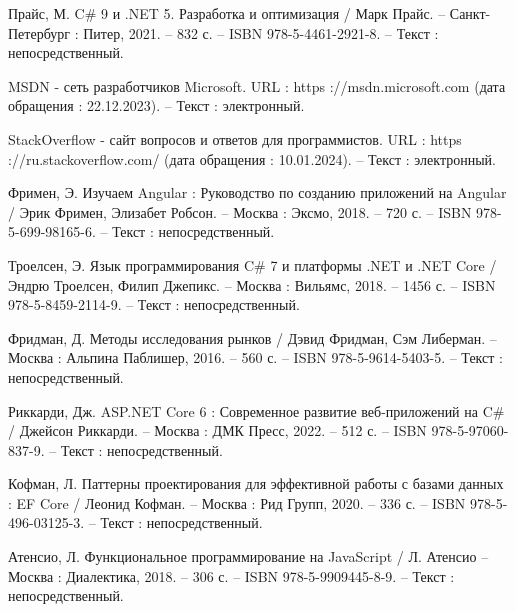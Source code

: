 \begin{thebibliography}{20}
     Прайс, М. C\# 9 и .NET 5. Разработка и оптимизация / Марк Прайс. – Санкт-Петербург : Питер, 2021. – 832 с. – ISBN 978-5-4461-2921-8. – Текст : непосредственный.

     MSDN -\- сеть разработчиков Microsoft. URL : https ://msdn.microsoft.com (дата обращения : 22.12.2023). – Текст : электронный.

     StackOverflow -\- сайт вопросов и ответов для программистов. URL : https ://ru.stackoverflow.com/ (дата обращения : 10.01.2024). – Текст : электронный.

     Фримен, Э. Изучаем Angular : Руководство по созданию приложений на Angular / Эрик Фримен, Элизабет Робсон. – Москва : Эксмо, 2018. – 720 с. – ISBN 978-5-699-98165-6. – Текст : непосредственный.

     Троелсен, Э. Язык программирования C\# 7 и платформы .NET и .NET Core / Эндрю Троелсен, Филип Джепикс. – Москва : Вильямс, 2018. – 1456 с. – ISBN 978-5-8459-2114-9. – Текст : непосредственный.

     Фридман, Д. Методы исследования рынков / Дэвид Фридман, Сэм Либерман. – Москва : Альпина Паблишер, 2016. – 560 с. – ISBN 978-5-9614-5403-5. – Текст : непосредственный.

     Риккарди, Дж. ASP.NET Core 6 : Современное развитие веб-приложений на C\# / Джейсон Риккарди. – Москва : ДМК Пресс, 2022. – 512 с. – ISBN 978-5-97060-837-9. – Текст : непосредственный.

     Кофман, Л. Паттерны проектирования для эффективной работы с базами данных : EF Core / Леонид Кофман. – Москва : Рид Групп, 2020. – 336 с. – ISBN 978-5-496-03125-3. – Текст : непосредственный.

     Атенсио, Л. Функциональное программирование на JavaScript / Л. Атенсио – Москва : Диалектика, 2018. – 306 с. – ISBN 978-5-9909445-8-9. – Текст : непосредственный.

\end{thebibliography}
